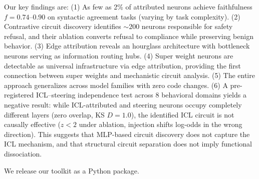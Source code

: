 \documentclass[11pt]{article}
\begin{document}
Our key findings are:
(1) As few as 2\% of attributed neurons achieve faithfulness $f{=}0.74$--$0.90$ on syntactic agreement tasks (varying by task complexity).
(2) Contrastive circuit discovery identifies ${\sim}200$ neurons responsible for safety refusal, and their ablation converts refusal to compliance while preserving benign behavior.
(3) Edge attribution reveals an hourglass architecture with bottleneck neurons serving as information routing hubs.
(4) Super weight neurons are detectable as universal infrastructure via edge attribution, providing the first connection between super weights and mechanistic circuit analysis.
(5) The entire approach generalizes across model families with zero code changes.
(6) A pre-registered ICL--steering independence test across 8 behavioral domains yields a negative result: while ICL-attributed and steering neurons occupy completely different layers (zero overlap, KS $D{=}1.0$), the identified ICL circuit is not causally effective ($z < 2$ under ablation, injection shifts log-odds in the wrong direction).
This suggests that MLP-based circuit discovery does not capture the ICL mechanism, and that structural circuit separation does not imply functional dissociation.

We release our toolkit as a Python package.
\end{document}
